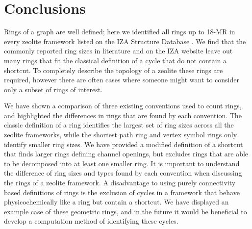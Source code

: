 \documentclass[preprint,numrefs,noinfo,sort&compress]{elsarticle}
\begin{document}
\begin{table}
\end{table}
\section{Conclusions}
\label{sec:org9840720}
Rings of a graph are well defined; here we identified all rings up to 18-MR in every zeolite framework listed on the IZA Structure Database \cite{baerlocher-database-nodate}. We find that the commonly reported ring sizes in literature and on the IZA website leave out many rings that fit the classical definition of a cycle that do not contain a shortcut. To completely describe the topology of a zeolite these rings are required, however there are often cases where someone might want to consider only a subset of rings of interest. 

We have shown a comparison of three existing conventions used to count rings, and highlighted the differences in rings that are found by each convention. The classic definition of a ring identifies the largest set of ring sizes across all the zeolite frameworks, while the shortest path ring and vertex symbol rings only identify smaller ring sizes. We have provided a modified definition of a shortcut that finds larger rings defining channel openings, but excludes rings that are able to be decomposed into at least one smaller ring. It is important to understand the difference of ring sizes and types found by each convention when discussing the rings of a zeolite framework. A disadvantage to using purely connectivity based definitions of rings is the exclusion of cycles in a framework that behave physicochemically like a ring but contain a shortcut. We have displayed an example case of these geometric rings, and in the future it would be beneficial to develop a computation method of identifying these cycles. 
\end{document}
